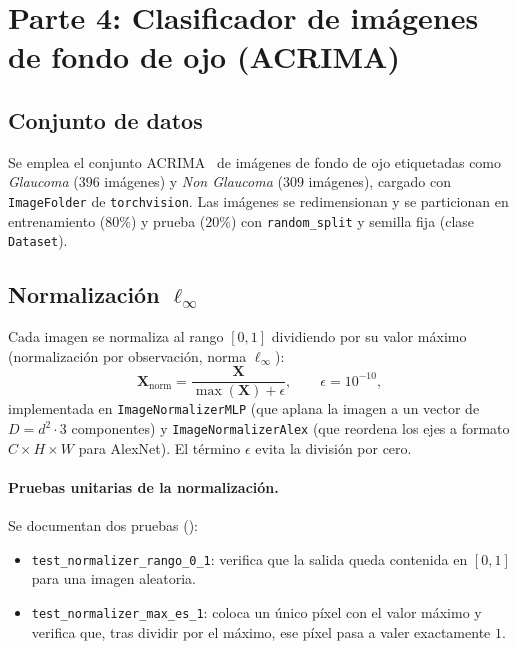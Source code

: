 \documentclass[11pt,a4paper]{article}
\begin{document}
\section{Parte 4: Clasificador de imágenes de fondo de ojo (ACRIMA)}\label{sec:parte4}

\subsection{Conjunto de datos}

Se emplea el conjunto ACRIMA~\cite{diazpinto2019acrima} de imágenes de fondo de
ojo etiquetadas como \emph{Glaucoma} ($396$ imágenes) y \emph{Non Glaucoma}
($309$ imágenes), cargado con \texttt{ImageFolder} de
\texttt{torchvision}. Las imágenes se redimensionan y se particionan en
entrenamiento ($80\%$) y prueba ($20\%$) con \texttt{random\_split} y semilla
fija (clase \texttt{Dataset}).

\subsection{Normalización \texorpdfstring{$\ell_\infty$}{l-infinito}}\label{sec:parte4-norm}

Cada imagen se normaliza al rango $[0,1]$ dividiendo por su valor máximo
(normalización por observación, norma $\ell_\infty$):
\begin{equation}
  \mathbf{X}_{\text{norm}}=\frac{\mathbf{X}}{\max(\mathbf{X})+\epsilon},
  \qquad \epsilon=10^{-10},
  \label{eq:linf}
\end{equation}
implementada en \texttt{ImageNormalizerMLP} (que aplana la imagen a un vector de
$D=d^2\cdot 3$ componentes) y \texttt{ImageNormalizerAlex} (que reordena los
ejes a formato $C\times H\times W$ para AlexNet). El término $\epsilon$ evita la
división por cero.

\paragraph{Pruebas unitarias de la normalización.}
Se documentan dos pruebas ():
\begin{itemize}[nosep]
  \item \texttt{test\_normalizer\_rango\_0\_1}: verifica que la salida queda
        contenida en $[0,1]$ para una imagen aleatoria.
  \item \texttt{test\_normalizer\_max\_es\_1}: coloca un único píxel con el
        valor máximo y verifica que, tras dividir por el máximo, ese píxel pasa
        a valer exactamente $1$.
\end{itemize}
\end{document}
